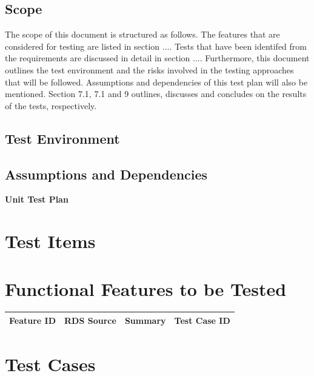 \documentclass[a4paper,12pt]{article}
\begin{document}
\subsection{Scope}
The scope of this document is structured as follows. The features that are considered for
testing are listed in section .... Tests that have been identifed from the requirements are
discussed in detail in section .... Furthermore, this document outlines the test environment
and the risks involved in the testing approaches that will be followed. Assumptions and
dependencies of this test plan will also be mentioned. Section 7.1, 7.1 and 9 outlines,
discusses and concludes on the results of the tests, respectively.
\subsection{Test Environment}
\subsection{Assumptions and Dependencies}

\newpage
\begin{center}
{\huge \bfseries Unit Test Plan}\\[0.5cm]
\end{center}
\section{Test Items}

\section{Functional Features to be Tested}
\begin{center}
 \begin{tabular}{||c| c| c| c||} 
 \hline
 Feature ID & RDS Source & Summary & Test Case ID \\ [0.5ex] 
 \hline\hline
\end{tabular}
\end{center}

\section{Test Cases}
\end{document}
